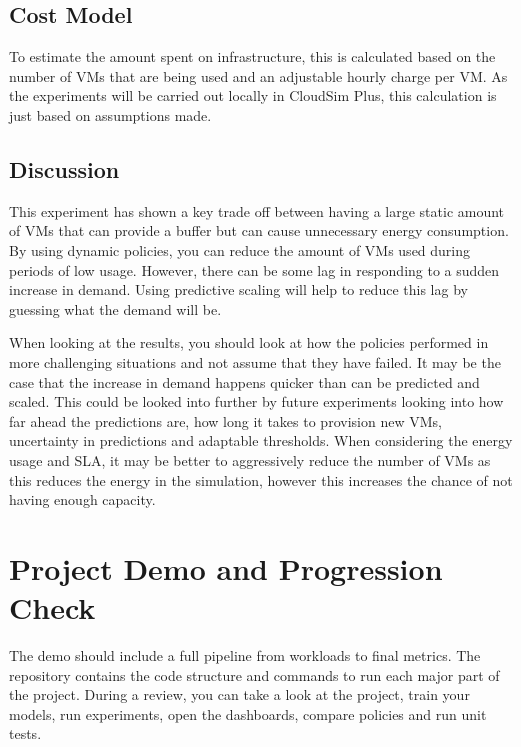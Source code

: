 \documentclass[10pt,journal,compsoc]{IEEEtran}
\begin{document}
\subsection{Cost Model}
To estimate the amount spent on infrastructure, this is calculated based on the number of VMs that are being used and an adjustable hourly charge per VM. As the experiments will be carried out locally in CloudSim Plus, this calculation is just based on assumptions made.

\subsection{Discussion}
This experiment has shown a key trade off between having a large static amount of VMs that can provide a buffer but can cause unnecessary energy consumption. By using dynamic policies, you can reduce the amount of VMs used during periods of low usage. However, there can be some lag in responding to a sudden increase in demand. Using predictive scaling will help to reduce this lag by guessing what the demand will be.

When looking at the results, you should look at how the policies performed in more challenging situations and not assume that they have failed. It may be the case that the increase in demand happens quicker than can be predicted and scaled. This could be looked into further by future experiments looking into how far ahead the predictions are, how long it takes to provision new VMs, uncertainty in predictions and adaptable thresholds. When considering the energy usage and SLA, it may be better to aggressively reduce the number of VMs as this reduces the energy in the simulation, however this increases the chance of not having enough capacity.

\section{Project Demo and Progression Check}
The demo should include a full pipeline from workloads to final metrics. The repository contains the code structure and commands to run each major part of the project. During a review, you can take a look at the project, train your models, run experiments, open the dashboards, compare policies and run unit tests.
\end{document}
